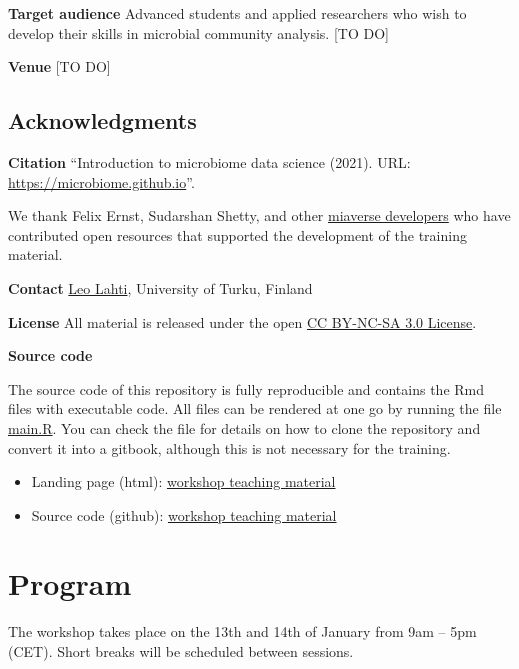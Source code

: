 \documentclass[
  oneside]{book}
\providecommand{\tightlist}{%
  \setlength{\itemsep}{0pt}\setlength{\parskip}{0pt}}
\begin{document}
\textbf{Target audience} Advanced students and applied researchers who wish
to develop their skills in microbial community analysis. {[}TO DO{]}

\textbf{Venue} {[}TO DO{]}

\hypertarget{acknowledgments}{%
\section{Acknowledgments}\label{acknowledgments}}

\textbf{Citation} ``Introduction to microbiome data science (2021). URL: \url{https://microbiome.github.io}''.

\citet{FindingPheno2022workshop}

We thank Felix Ernst, Sudarshan Shetty, and other \href{https://microbiome.github.io}{miaverse
developers} who have contributed open
resources that supported the development of the training material.

\textbf{Contact} \href{http://datascience.utu.fi}{Leo Lahti}, University of Turku, Finland

\textbf{License} All material is released under the open \href{LICENSE}{CC BY-NC-SA 3.0 License}.

\textbf{Source code}

The source code of this repository is fully reproducible and contains
the Rmd files with executable code. All files can be rendered at one
go by running the file \url{main.R}. You can check the file for
details on how to clone the repository and convert it into a gitbook,
although this is not necessary for the training.

\begin{itemize}
\tightlist
\item
  Landing page (html): \href{https://microbiome.github.io/course_2022_FindingPheno/}{workshop teaching material}
\item
  Source code (github): \href{https://github.com/microbiome/course_2022_FindingPheno}{workshop teaching material}
\end{itemize}

\hypertarget{program}{%
\chapter{Program}\label{program}}

The workshop takes place on the 13th and 14th of January from 9am -- 5pm
(CET). Short breaks will be scheduled between sessions.
\end{document}
